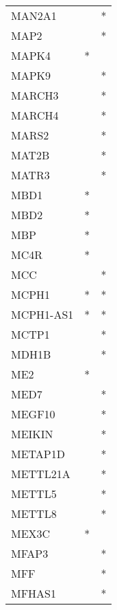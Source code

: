 \begin{longtable}{lcc}
MAN2A1          &                &          * \\
MAP2            &                &          * \\
MAPK4           &              * &            \\
MAPK9           &                &          * \\
MARCH3          &                &          * \\
MARCH4          &                &          * \\
MARS2           &                &          * \\
MAT2B           &                &          * \\
MATR3           &                &          * \\
MBD1            &              * &            \\
MBD2            &              * &            \\
MBP             &              * &            \\
MC4R            &              * &            \\
MCC             &                &          * \\
MCPH1           &              * &          * \\
MCPH1-AS1       &              * &          * \\
MCTP1           &                &          * \\
MDH1B           &                &          * \\
ME2             &              * &            \\
MED7            &                &          * \\
MEGF10          &                &          * \\
MEIKIN          &                &          * \\
METAP1D         &                &          * \\
METTL21A        &                &          * \\
METTL5          &                &          * \\
METTL8          &                &          * \\
MEX3C           &              * &            \\
MFAP3           &                &          * \\
MFF             &                &          * \\
MFHAS1          &                &          * \\

\end{longtable}
